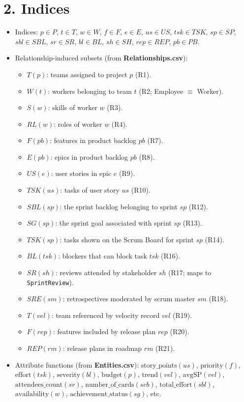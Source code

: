 \documentclass[11pt]{article}
\begin{document}
\section{2. Indices}
\begin{itemize}
  \item Indices: $p\in P$, $t\in T$, $w\in W$, $f\in F$, $e\in E$, $us\in US$, $tsk\in TSK$, $sp\in SP$, $sbl\in SBL$, $sr\in SR$, $bl\in BL$, $sh\in SH$, $rep\in REP$, $pb\in PB$.
  \item Relationship-induced subsets (from \textbf{Relationships.csv}):
    \begin{itemize}
      \item $T(p)$: teams assigned to project $p$ (R1).
      \item $W(t)$: workers belonging to team $t$ (R2; Employee $\equiv$ Worker).
      \item $S(w)$: skills of worker $w$ (R3).
      \item $RL(w)$: roles of worker $w$ (R4).
      \item $F(pb)$: features in product backlog $pb$ (R7).
      \item $E(pb)$: epics in product backlog $pb$ (R8).
      \item $US(e)$: user stories in epic $e$ (R9).
      \item $TSK(us)$: tasks of user story $us$ (R10).
      \item $SBL(sp)$: the sprint backlog belonging to sprint $sp$ (R12).
      \item $SG(sp)$: the sprint goal associated with sprint $sp$ (R13).
      \item $TSK(sp)$: tasks shown on the Scrum Board for sprint $sp$ (R14).
      \item $BL(tsk)$: blockers that can block task $tsk$ (R16).
      \item $SR(sh)$: reviews attended by stakeholder $sh$ (R17; maps to \texttt{SprintReview}).
      \item $SRE(sm)$: retrospectives moderated by scrum master $sm$ (R18).
      \item $T(vel)$: team referenced by velocity record $vel$ (R19).
      \item $F(rep)$: features included by release plan $rep$ (R20).
      \item $REP(rm)$: release plans in roadmap $rm$ (R21).
    \end{itemize}
  \item Attribute functions (from \textbf{Entities.csv}): 
  $\text{story\_points}(us)$, $\text{priority}(f)$, $\text{effort}(tsk)$, $\text{severity}(bl)$, $\text{budget}(p)$, $\text{trend}(vel)$, $\text{avgSP}(vel)$, $\text{attendees\_count}(sr)$, $\text{number\_of\_cards}(scb)$, $\text{total\_effort}(sbl)$, $\text{availability}(w)$, $\text{achievement\_status}(sg)$, etc.
\end{itemize}
\end{document}
